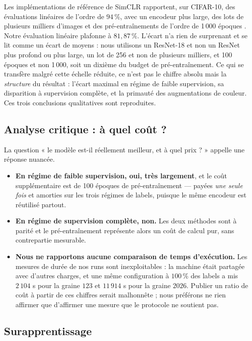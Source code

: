\documentclass[11pt,a4paper]{article}
\begin{document}
Les implémentations de référence de SimCLR rapportent, sur CIFAR-10, des évaluations
linéaires de l'ordre de $94\,\%$, avec un encodeur plus large, des lots de plusieurs milliers
d'images et des pré-entraînements de l'ordre de 1\,000 époques \cite{chen2020simclr}. Notre
évaluation linéaire plafonne à $81{,}87\,\%$. L'écart n'a rien de surprenant et se lit comme
un écart de moyens : nous utilisons un ResNet-18 et non un ResNet plus profond ou plus large,
un lot de 256 et non de plusieurs milliers, et 100 époques et non 1\,000, soit un dixième du
budget de pré-entraînement. Ce qui se transfère malgré cette échelle réduite, ce n'est pas le
chiffre absolu mais la \emph{structure} du résultat : l'écart maximal en régime de faible
supervision, sa disparition à supervision complète, et la primauté des augmentations de
couleur. Ces trois conclusions qualitatives sont reproduites.

\subsection{Analyse critique : à quel coût ?}

La question « le modèle est-il réellement meilleur, et à quel prix ? » appelle une réponse
nuancée.

\begin{itemize}
\item \textbf{En régime de faible supervision, oui, très largement}, et le coût
supplémentaire est de 100 époques de pré-entraînement --- payées \emph{une seule fois} et
amorties sur les trois régimes de labels, puisque le même encodeur est réutilisé partout.
\item \textbf{En régime de supervision complète, non.} Les deux méthodes sont à parité et le
pré-entraînement représente alors un coût de calcul pur, sans contrepartie mesurable.
\item \textbf{Nous ne rapportons aucune comparaison de temps d'exécution.} Les mesures de
durée de nos runs sont inexploitables : la machine était partagée avec d'autres charges, et
une même configuration à $100\,\%$ des labels a mis $2\,104$ s pour la graine $123$ et
$11\,914$ s pour la graine $2026$. Publier un ratio de coût à partir de ces chiffres serait
malhonnête ; nous préférons ne rien affirmer que d'affirmer une mesure que le protocole ne
soutient pas.
\end{itemize}

\subsection{Surapprentissage}
\label{sec:surapp}
\end{document}
